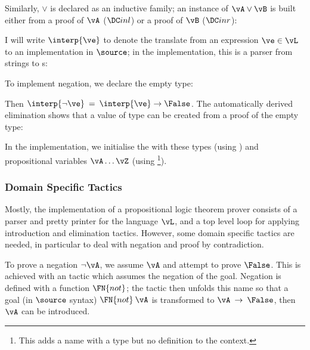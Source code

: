 Similarly, $\lor$ is declared as an inductive family; an instance of
$\vA\lor\vB$ is built either from a proof of $\vA$ ($\orintrol$) or a
proof of $\vB$ ($\orintror$):

\DM{
\AR{
\Data\:\Tor\:(\vA,\vB\Hab\Type)\Hab\Type\hg\Where\\
\hg\hg\ARd{
& \orintrol\Hab\fbind{\va}{\vA}{\Tor\:\vA\:\vB}\\
\mid & \orintror\Hab\fbind{\vb}{\vB}{\Tor\:\vA\:\vB}
}
}
}

I will write $\interp{\ve}$ to denote the translate from an expression
$\ve\in\vL$ to an implementation in $\source$; in the implementation,
this is a parser from strings to s:


To implement negation, we declare the empty type:

\DM{
\Data\:\False\Hab\Type\hg\Where
}

Then $\interp{\neg\ve}\:=\:\interp{\ve}\to\False$. The automatically
derived elimination shows that a value
of  type can be created from a proof of the empty type:

\DM{
\Elim{\False}\Hab\fbind{\vx}{\False}{
\fbind{\motive}{\False\to\Type}{\motive\:\vx}}
}

In the implementation, we initialise the  with these
types (using ) and propositional variables
$\vA\ldots\vZ$ (using \footnote{This adds a name with
  a type but no definition to the context.}).

\subsubsection{Domain Specific Tactics}
Mostly, the implementation of a propositional logic theorem prover
consists of a parser and pretty printer for the language $\vL$, and a
top level loop for applying introduction and elimination
tactics. However, some domain
specific tactics are needed, in particular to deal with negation and
proof by contradiction. 

To prove a negation $\neg\vA$, we assume $\vA$ and attempt to prove
$\False$. This is achieved with an  tactic which
assumes the negation of the goal. Negation is defined with a function
$\FN{not}$; the  tactic then unfolds this name so
that a goal (in $\source$ syntax) $\FN{not}\:\vA$ is transformed to
$\vA\:\to\:\False$, then $\vA$ can be introduced.

